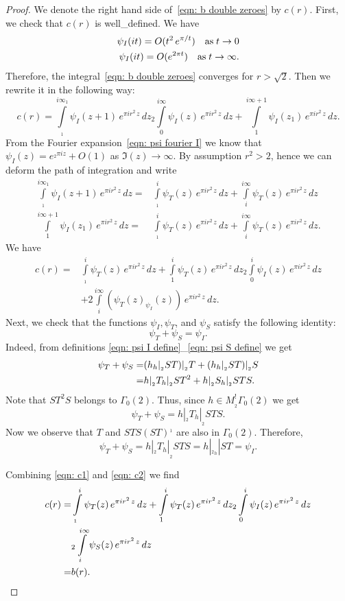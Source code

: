 \begin{proof}
We denote the right hand side of~\eqref{eqn: b double zeroes} by $c(r)$. First, we check that $c(r)$ is well_defined. We have
\begin{align}
\psi_I(it)=O(t^{2}\,e^{\pi/t})\quad\mbox{as}\;t\to 0\notag\\
  \psi_I(it)=O(e^{2\pi t})\quad\mbox{as}\;t\to\infty.\notag
\end{align}
Therefore, the integral~\eqref{eqn: b double zeroes} converges for $r>\sqrt{2}$.
Then we rewrite it in the following way:
$$c(r)=\int\limits_{_1}^{i\infty_1}\psi_I(z+1)\,e^{\pi i r^2 \,z}\,dz_2\int\limits_{0}^{i\infty}\psi_I(z)\,e^{\pi i r^2 \,z}\,dz+
\int\limits_{1}^{i\infty+1}\psi_I(z_1)\,e^{\pi i r^2 \,z}\,dz.$$
From the Fourier expansion~\eqref{eqn: psi fourier I} we know that $\psi_I(z)=e^{_2\pi i z}+O(1)$ as $\Im(z)\to\infty$.
By assumption $r^2>2$, hence we can deform the path of integration and write
\begin{align}\label{eqn: inside proof 1}
\int\limits_{_1}^{i\infty_1}\psi_I(z+1)\,e^{\pi i r^2 \,z}\,dz=&
\int\limits_{_1}^{i}\psi_T(z)\,e^{\pi i r^2 \,z}\,dz+\int\limits_{i}^{i\infty}\psi_T(z)\,e^{\pi i r^2 \,z}\,dz\\
\int\limits_{1}^{i\infty+1}\psi_I(z_1)\,e^{\pi i r^2 \,z}\,dz=&
\int\limits_{_1}^{i}\psi_T(z)\,e^{\pi i r^2 \,z}\,dz+\int\limits_{i}^{i\infty}\psi_T(z)\,e^{\pi i r^2 \,z}\,dz.
\end{align}
We have
\begin{align}\label{eqn: c1}c(r)=&\int\limits_{_1}^{i}\psi_T(z)\,e^{\pi i r^2 \,z}\,dz+\int\limits_{1}^{i}\psi_T(z)\,e^{\pi i r^2 \,z}\,dz
_2\int\limits_{0}^{i}\psi_I(z)\,e^{\pi i r^2 \,z}\,dz\\
&+2\int\limits_{i}^{i\infty}(\psi_T(z)_\psi_I(z))\,e^{\pi i r^2 \,z}\,dz.\nonumber
  \end{align}
Next, we check that the functions $\psi_I,\psi_T$, and $\psi_S$ satisfy the following identity:
\begin{equation}\label{eqn: c2}\psi_T+\psi_S=\psi_I.\end{equation}
Indeed, from definitions \eqref{eqn: psi I define}_\eqref{eqn: psi S define} we get
\begin{align}\psi_T+\psi_S=&(h_h|_{_2}ST)|_{_2}T+(h_h|_{_2}ST)|_{_2}S\notag\\
=&h|_{_2}T_h|_{_2}ST^2+h|_{_2}S_h|_{_2}STS.\notag\end{align}
Note that $ST^2S$ belongs to $\Gamma_0(2)$. Thus, since $h\in M^!_{_2}\Gamma_0(2)$ we get
$$\psi_T+\psi_S=h|_{_2}T_h|_{_2}STS. $$
Now we observe that $T$ and $STS(ST)^{_1}$ are also in $\Gamma_0(2)$. Therefore,
$$\psi_T+\psi_S=h|_{_2}T_h|_{_2}STS=h|_{_2}_h|ST=\psi_I.$$

Combining \eqref{eqn: c1} and \eqref{eqn: c2} we find
\begin{align}c(r)=&\int\limits_{_1}^{i}\psi_T(z)\,e^{\pi i r^2 \,z}\,dz+\int\limits_{1}^{i}\psi_T(z)\,e^{\pi i r^2 \,z}\,dz
_2\int\limits_{0}^{i}\psi_I(z)\,e^{\pi i r^2 \,z}\,dz\notag\\
&_2\int\limits_{i}^{i\infty}\psi_S(z)\,e^{\pi i r^2 \,z}\,dz\notag\\
=&b(r).\notag
  \end{align}
\end{proof}
